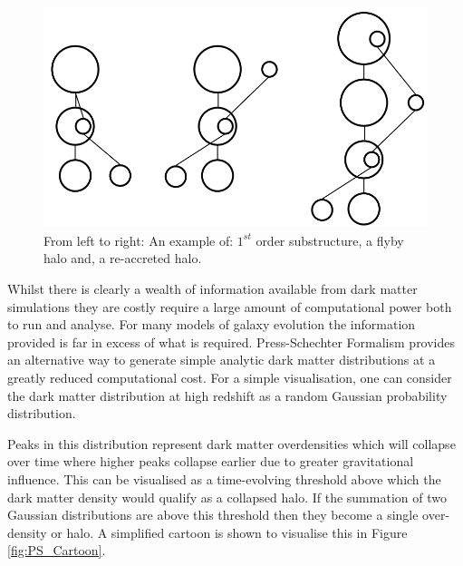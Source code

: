 \begin{figure}[h]
    \centering
    \includegraphics[width = \linewidth]{Figures/Chapter1/Substructures.png}
    \caption{From left to right: An example of: $1^{st}$ order substructure, a flyby halo and, a re-accreted halo.}
    \label{fig:Substructures}
\end{figure}

Whilst there is clearly a wealth of information available from dark matter simulations they are costly require a large amount of computational power both to run and analyse. For many models of galaxy evolution the information provided is far in excess of what is required. Press-Schechter Formalism \citep{Press1974} provides an alternative way to generate simple analytic dark matter distributions at a greatly reduced computational cost. For a simple visualisation, one can consider the dark matter distribution at high redshift as a random Gaussian probability distribution. 


Peaks in this distribution represent dark matter overdensities which will collapse over time where higher peaks collapse earlier due to greater gravitational influence. This can be visualised as a time-evolving threshold above which the dark matter density would qualify as a collapsed halo. If the summation of two Gaussian distributions are above this threshold then they become a single over-density or halo. A simplified cartoon is shown to visualise this in Figure \ref{fig:PS_Cartoon}.

